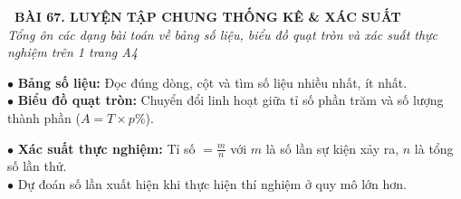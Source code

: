 \documentclass[14pt,a4paper,oneside]{extbook}
\begin{document}
\noindent
\begin{tcolorbox}[
  enhanced,
  colback=teal!8!white,
  colframe=teal!80!black,
  arc=3mm,
  boxrule=1.1pt,
  width=\linewidth,
  halign=center,
  top=2.2mm, bottom=2.2mm,
  left=3mm, right=3mm,
  drop fuzzy shadow
]
  {\large\bfseries\color{teal!95!black}\faBookmark\ BÀI 67. LUYỆN TẬP CHUNG THỐNG KÊ \& XÁC SUẤT}\\[2pt]
  {\scriptsize\color{black!75}\itshape Tổng ôn các dạng bài toán về bảng số liệu, biểu đồ quạt tròn và xác suất thực nghiệm trên 1 trang A4}
\end{tcolorbox}

\vspace{3.2mm}
\noindent
\begin{minipage}[t]{0.54\textwidth}
  \begin{tcolorbox}[
    enhanced,
    title={\footnotesize\bfseries\color{white}\faBarChart\ 1. Trọng tâm Thống kê},
    colback=blue!2!white,
    colframe=blue!75!black,
    arc=2.5mm, boxrule=0.8pt, top=1.8mm, bottom=1.8mm, left=2.2mm, right=2.2mm
  ]
    \footnotesize
    $\bullet$ \textbf{Bảng số liệu:} Đọc đúng dòng, cột và tìm số liệu nhiều nhất, ít nhất.\\
    $\bullet$ \textbf{Biểu đồ quạt tròn:} Chuyển đổi linh hoạt giữa tỉ số phần trăm và số lượng thành phần ($A = T \times p\%$).
  \end{tcolorbox}
\end{minipage}%
\hfill
\begin{minipage}[t]{0.44\textwidth}
  \begin{tcolorbox}[
    enhanced,
    title={\footnotesize\bfseries\color{white}\faCubes\ 2. Trọng tâm Xác suất},
    colback=teal!2!white,
    colframe=teal!75!black,
    arc=2.5mm, boxrule=0.8pt, top=1.8mm, bottom=1.8mm, left=2mm, right=2mm
  ]
    \footnotesize
    $\bullet$ \textbf{Xác suất thực nghiệm:} Tỉ số $=\frac{m}{n}$ với $m$ là số lần sự kiện xảy ra, $n$ là tổng số lần thử.\\
    $\bullet$ Dự đoán số lần xuất hiện khi thực hiện thí nghiệm ở quy mô lớn hơn.
  \end{tcolorbox}
\end{minipage}

\vspace{3mm}
\end{document}
